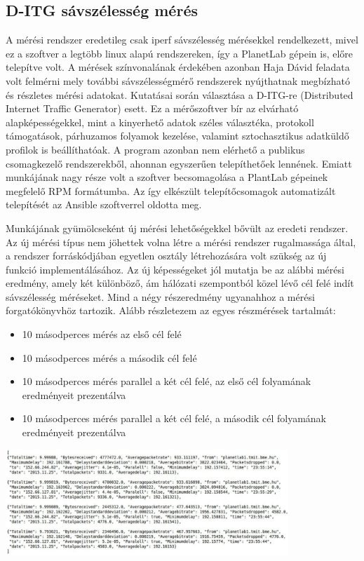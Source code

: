 \subsection*{D-ITG sávszélesség mérés}
A mérési rendszer eredetileg csak iperf sávszélesség mérésekkel rendelkezett, mivel ez a szoftver a legtöbb linux alapú rendszereken, így a PlanetLab gépein is, előre telepítve volt. A mérések színvonalának érdekében azonban Haja Dávid feladata volt felmérni mely további sávszélességmérő rendszerek nyújthatnak megbízható és részletes mérési adatokat. Kutatásai során választása a D-ITG-re (Distributed Internet Traffic Generator) esett. Ez a mérőszoftver bír az elvárható alapképességekkel, mint a kinyerhető adatok széles választéka, protokoll támogatások, párhuzamos folyamok kezelése, valamint sztochasztikus adatküldő profilok is beállíthatóak. A program azonban nem elérhető a publikus csomagkezelő rendszerekből, ahonnan egyszerűen telepíthetőek lennének. Emiatt munkájának nagy része volt a szoftver becsomagolása a PlantLab gépeinek megfelelő RPM formátumba. 
Az így elkészült telepítőcsomagok automatizált telepítését az Ansible szoftverrel oldotta meg.

Munkájának gyümölcseként új mérési lehetőségekkel bővült az eredeti rendszer. Az új mérési típus nem jöhettek volna létre a mérési rendszer rugalmassága által, a rendszer forráskódjában egyetlen osztály létrehozására volt szükség az új funkció implementálásához. Az új képességeket jól mutatja be az alábbi mérési eredmény, amely két különböző, ám hálózati szempontból közel lévő cél felé indít sávszélesség méréseket. Mind a négy részeredmény ugyanahhoz a mérési forgatókönyvhöz tartozik. Alább részletezem az egyes részmérések tartalmát:

\begin{itemize}
\item 10 másodperces mérés az első cél felé
\item 10 másodperces mérés a második cél felé
\item 10 másodperces mérés parallel a két cél felé, az első cél folyamának eredményeit prezentálva
\item 10 másodperces mérés parallel a két cél felé, a második cél folyamának eredményeit prezentálva
\end{itemize}

\begin{center}
\includegraphics[width=0.8\textwidth,keepaspectratio]{figures/d-itg-measure.PNG}
\end{center}


